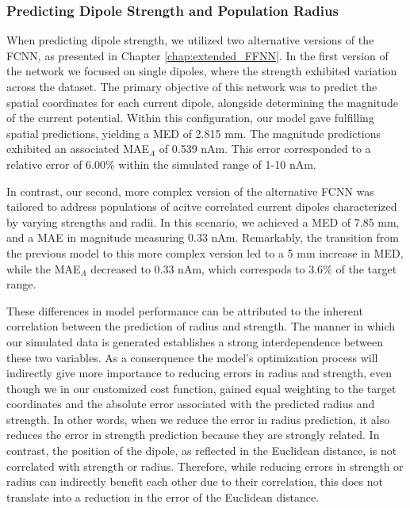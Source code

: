 \documentclass[a4paper, UKenglish, 11pt]{uiomaster}
\begin{document}
\subsubsection{Predicting Dipole Strength and Population Radius}
When predicting dipole strength, we utilized two alternative versions of the FCNN, as presented in Chapter \ref{chap:extended_FFNN}. In the first version of the network we focused on single dipoles, where the strength exhibited variation across the dataset. The primary objective of this network was to predict the spatial coordinates for each current dipole, alongside determining the magnitude of the current potential. Within this configuration, our model gave fulfilling spatial predictions, yielding a MED of 2.815 mm. The magnitude predictions exhibited an associated MAE$_{A}$ of 0.539 nAm. This error corresponded to a relative error of 6.00$\%$ within the simulated range of 1-10 nAm.

In contrast, our second, more complex version of the alternative FCNN was tailored to address populations of acitve correlated current dipoles characterized by varying strengths and radii. In this scenario, we achieved a MED of 7.85 mm, and a MAE in magnitude measuring 0.33 nAm. Remarkably, the transition from the previous model to this more complex version led to a 5 mm increase in MED, while the MAE$_{A}$ decreased to 0.33 nAm, which correspods to 3.6$\%$ of the target range.

These differences in model performance can be attributed to the inherent correlation between the prediction of radius and strength. The manner in which our simulated data is generated establishes a strong interdependence between these two variables. As a conserquence the model's optimization process will indirectly give more importance to reducing errors in radius and strength, even though we in our customized cost function, gained equal weighting to the target coordinates and the absolute error associated with the predicted radius and strength. In other words, when we reduce the error in radius prediction, it also reduces the error in strength prediction because they are strongly related. In contrast, the position of the dipole, as reflected in the Euclidean distance, is not correlated with strength or radius. Therefore, while reducing errors in strength or radius can indirectly benefit each other due to their correlation, this does not translate into a reduction in the error of the Euclidean distance.
\end{document}
